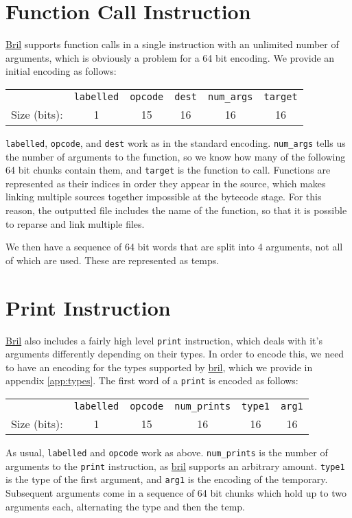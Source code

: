 \documentclass{article}
\newcommand{\bril}{\href{https://capra.cs.cornell.edu/bril/}{bril}}
\newcommand{\Bril}{\href{https://capra.cs.cornell.edu/bril/}{Bril}}
\begin{document}
\section{Function Call Instruction}
\Bril{} supports function calls in a single instruction with an unlimited number
of arguments, which is obviously a problem for a 64 bit encoding. We provide an
initial encoding as follows:
\begin{center}
  \begin{tabular}{r|c|c|c|c|c|}
    \cline{2-6}
    & \texttt{labelled} & \texttt{opcode} & \texttt{dest} & \texttt{num\_args}
    & \texttt{target} \\ \cline{2-6}
    Size (bits): & 1 & 15 & 16 & 16 & 16 \\ \cline{2-6}
  \end{tabular}
\end{center}
\texttt{labelled}, \texttt{opcode}, and \texttt{dest} work as in the standard
encoding. \texttt{num\_args} tells us the number of arguments to the function, so
we know how many of the following 64 bit chunks contain them, and
\texttt{target} is the function to call. Functions are represented as their
indices in order they appear in the source, which makes linking multiple sources
together impossible at the bytecode stage. For this reason, the outputted file
includes the name of the function, so that it is possible to reparse and link
multiple files.

We then have a sequence of 64 bit words that are split into 4 arguments, not all
of which are used. These are represented as temps.

\section{Print Instruction}
\Bril{} also includes a fairly high level \texttt{print} instruction, which
deals with it's arguments differently depending on their types. In order to
encode this, we need to have an encoding for the types supported by \bril{},
which we provide in appendix \ref{app:types}. The first word of a \texttt{print}
is encoded as follows:
\begin{center}
  \begin{tabular}{r|c|c|c|c|c|}
    \cline{2-6}
    & \texttt{labelled} & \texttt{opcode} & \texttt{num\_prints} & \texttt{type1}
    & \texttt{arg1} \\ \cline{2-6}
    Size (bits): & 1 & 15 & 16 & 16 & 16 \\ \cline{2-6}
  \end{tabular}
\end{center}
As usual, \texttt{labelled} and \texttt{opcode} work as
above. \texttt{num\_prints} is the number of arguments to the \texttt{print}
instruction, as \bril{} supports an arbitrary amount. \texttt{type1} is the type
of the first argument, and \texttt{arg1} is the encoding of the
temporary. Subsequent arguments come in a sequence of 64 bit chunks which hold
up to two arguments each, alternating the type and then the temp.
\end{document}
